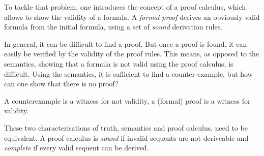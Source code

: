            To tackle that problem, one introduces the concept of a proof calculus, which allows to show the validity of a formula.
            A \emph{formal proof} derives an obviously valid formula from the initial formula, using a set of \emph{sound} derivation rules.

            In general, it can be difficult to find a proof.
            But once a proof is found, it can easily be verified by the validity of the proof rules.
            This means, as opposed to the semantics, showing that a formula is not valid using the proof calculus, is difficult.
            Using the semantics, it is sufficient to find a counter-example, but how can one show that there is no proof?


            A counterexample is a witness for not validity, a (formal) proof is a witness for validity. 


            These two characterisations of truth, semantics and proof calculus, need to be equivalent.
            A proof calculus is \emph{sound} if invalid sequents are not deriveable and \emph{complete} if every valid sequent can be derived.






